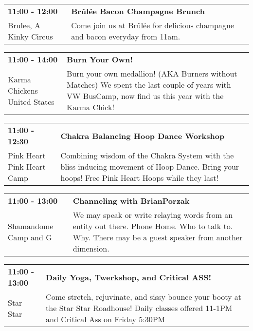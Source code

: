 \begin{tabular}{ p{1in} p{2.2in} }
    \textbf{11:00 - 12:00} & \textbf{Br\^ul\'ee Bacon Champagne Brunch} \\
    Brulee, A Kinky Circus \newline  & Come join us at Br\^ul\'ee for delicious champagne and bacon everyday from 11am. \\
    \hline 
\end{tabular}
    
\begin{tabular}{ p{1in} p{2.2in} }
    \textbf{11:00 - 14:00} & \textbf{Burn Your Own!} \\
    Karma Chickens \newline United States & Burn your own medallion! (AKA Burners without Matches) We spent the last couple of years with VW BusCamp, now find us this year with the Karma Chick! \\
    \hline 
\end{tabular}
    
\begin{tabular}{ p{1in} p{2.2in} }
    \textbf{11:00 - 12:30} & \textbf{Chakra Balancing Hoop Dance Workshop} \\
    Pink Heart \newline Pink Heart Camp & Combining wisdom of the Chakra System with the bliss inducing movement of Hoop Dance. Bring your hoops! Free Pink Heart Hoops while they last! \\
    \hline 
\end{tabular}
    
\begin{tabular}{ p{1in} p{2.2in} }
    \textbf{11:00 - 13:00} & \textbf{Channeling with BrianPorzak} \\
    Shamandome Camp \newline 615 and G & We may speak or write relaying words from an entity out there. Phone Home. Who to talk to. Why. 
There may be a guest speaker from another dimension. \\
    \hline 
\end{tabular}
    
\begin{tabular}{ p{1in} p{2.2in} }
    \textbf{11:00 - 13:00} & \textbf{Daily Yoga, Twerkshop, and Critical ASS!} \\
    Star Star \newline  & Come stretch, rejuvinate, and sissy bounce your booty at the Star Star Roadhouse! Daily classes offered 11-1PM and Critical Ass on Friday 5:30PM \\
    \hline 
\end{tabular}
    
